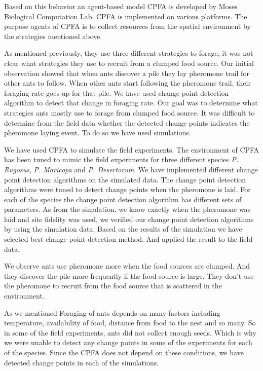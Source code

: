 Based on this behavior an agent-based model CPFA\cite{hecker2015beyond} is developed by Moses Biological Computation Lab. CPFA is implemented on various platforms. The purpose agents of CPFA is to collect resources from the spatial environment by the strategies mentioned above. 

As mentioned previously, they use three different strategies to forage\cite{collett2010desert,flanagan2012quantifying}, it was not clear what strategies they use to recruit from a clumped food source\cite{tarasewich2002swarm}. Our initial observation showed that when ants discover a pile they lay pheromone trail for other ants to follow. When other ants start following the pheromone trail, their foraging rate goes up for that pile. We have used change point detection algorithm to detect that change in foraging rate. Our goal was to determine what strategies ants mostly use to forage from clumped food source. It was difficult to determine from the field data whether the detected change points indicates the pheromone laying event. To do so we have used simulations. 

We have used CPFA to simulate the field experiments. The environment of CPFA has been tuned to mimic the field experiments for three different species \textit{P. Rugosus}, \textit{P. Maricopa} and \textit{P. Desertorum}. We have implemented different change point detection algorithms on the simulated data\cite{fryzlewicz2014wild, scott1974cluster, kukulski2000normal}. The change point detection algorithms were tuned to detect change points when the pheromone is laid. For each of the species the change point detection algorithm has different sets of parameters. As from the simulation, we know exactly when the pheromone was laid and site fidelity was used, we verified our change point detection algorithms by using the simulation data. Based on the results of the simulation we have selected best change point detection method. And applied the result to the field data. 

We observe ants use pheromone more when the food sources are clumped. And they discover the pile more frequently if the food source is large. They don't use the pheromone to recruit from the food source that is scattered in the environment. 

As we mentioned Foraging of ants depends on many factors including temperature, availability of food, distance from food to the nest and so many\cite{whitford1975factors,gordon1996founding}. So in some of the field experiments, ants did not collect enough seeds. Which is why we were unable to detect any change points in some of the experiments for each of the species. Since the CPFA does not depend on these conditions, we have detected change points in each of the simulations.
